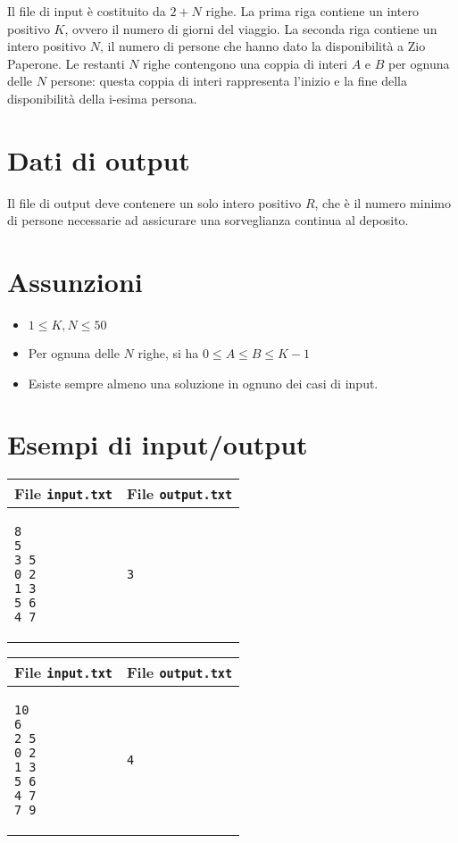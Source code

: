 \documentclass[a4paper,11pt]{article}
\begin{document}
Il file di input è costituito da $2+N$ righe. La prima riga contiene un
intero positivo $K$, ovvero il numero di giorni del viaggio. La seconda
riga contiene un intero positivo $N$, il numero di persone che hanno
dato la disponibilità a Zio Paperone. Le restanti $N$ righe contengono
una coppia di interi $A$ e $B$ per ognuna delle $N$ persone: questa
coppia di interi rappresenta l'inizio e la fine della disponibilità
della i-esima persona.  
    
\section*{Dati di output}
  
Il file di output deve contenere un solo intero positivo $R$, che è il
numero minimo di persone necessarie ad assicurare una sorveglianza
continua al deposito. 
    
\section*{Assunzioni}
\begin{itemize}
  \item $1 ≤ K, N ≤ 50$
  \item Per ognuna delle $N$ righe, si ha $0 ≤ A ≤ B ≤ K-1$
  \item  Esiste sempre almeno una soluzione in ognuno dei casi di input.
\end{itemize}

\section*{Esempi di input/output}
    \noindent
    \begin{tabular}{p{11cm}|p{5cm}}
    \toprule
    \textbf{File \texttt{input.txt}}
    & \textbf{File \texttt{output.txt}}
    \\
    \midrule
    \scriptsize
    \begin{verbatim}
8
5
3 5
0 2
1 3
5 6
4 7
      \end{verbatim}
    &
    \scriptsize
    \begin{verbatim}
3
      \end{verbatim}
    \\
    \bottomrule
    \end{tabular}
  
    \noindent
    \begin{tabular}{p{11cm}|p{5cm}}
    \toprule
    \textbf{File \texttt{input.txt}}
    & \textbf{File \texttt{output.txt}}
    \\
    \midrule
    \scriptsize
    \begin{verbatim}
10
6
2 5
0 2
1 3
5 6
4 7
7 9
      \end{verbatim}
    &
    \scriptsize
    \begin{verbatim}
4
      \end{verbatim}
    \\
    \bottomrule
    \end{tabular}
\end{document}
